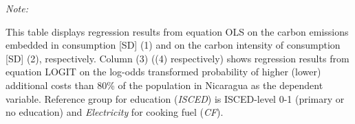 \begin{table}[htbp!]
\begin{adjustbox}{width = 1\textwidth, max height = 0.95\textheight, center}
\begin{threeparttable}[b]
         \begin{tablenotes}\item \medskip \textit{Note:}
            \item This table displays regression results from equation OLS on the carbon emissions embedded in consumption [SD] (1) and on the carbon intensity of consumption [SD] (2), respectively. 
                                      Column (3) ((4) respectively) shows regression results from equation LOGIT on the log-odds transformed probability of higher (lower) additional costs than 80\% of the population in Nicaragua as the dependent variable. Reference group for education (\textit{ISCED}) is ISCED-level 0-1 (primary or no education) and \textit{Electricity} for cooking fuel (\textit{CF}).
         \end{tablenotes}
      \end{threeparttable}
   \end{adjustbox}
\end{table}


